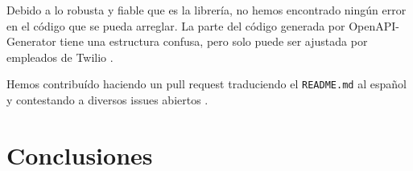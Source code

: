 \documentclass{article}
\begin{document}
Debido a lo robusta y fiable que es la librería,
no hemos encontrado ningún error en el código que se pueda arreglar.
La parte del código generada por OpenAPI-Generator
tiene una estructura confusa,
pero solo puede ser ajustada por empleados de Twilio \cite{contributing}.

Hemos contribuído haciendo un pull request
traduciendo el \verb|README.md| al español
\cite{contribución-readme}
y contestando a diversos issues abiertos
\cite{contribución-repeated-code}
\cite{contribución-security-improvements}
\cite{contribución-wrong-login}.

\section{Conclusiones}

\newpage

\printbibliography
\end{document}
